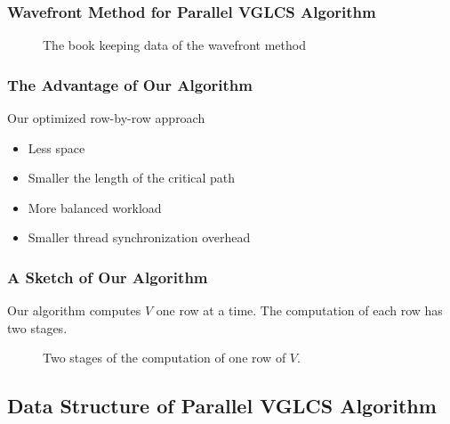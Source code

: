 \begin{withoutheadline}
\begin{frame}
	\frametitle{Wavefront Method for Parallel VGLCS Algorithm}
	\begin{figure}[!thb]
	  \centering {} 
	  \caption{The book keeping data of the wavefront method}
	  \label{fig:fig-VGLCS-dp-wavefront}
	\end{figure}
\end{frame}
\end{withoutheadline}

\begin{frame}
	\frametitle{The Advantage of Our Algorithm}
	Our optimized row-by-row approach
	\begin{itemize}
		\setlength\itemsep{1em}
		\item 
			Less space
		\item 
			Smaller the length of the critical path
		\item 
			More balanced workload
		\item 
			Smaller thread synchronization overhead
	\end{itemize}
\end{frame}

\begin{frame}
	\frametitle{A Sketch of Our Algorithm}
	Our algorithm computes $V$ one row at a time.  The computation of
	each row has two stages.
	\begin{center}
		\scalebox{.7} { \begin{minipage}{1.2\textwidth}
			\begin{figure}
			  \centering {} 
			  \caption{Two stages of the computation of one row of $V$.}
			  \label{fig:fig-VGLCS-dp-rmq}
			\end{figure}
			\end{minipage}
		}
	\end{center}
\end{frame}

\subsection{Data Structure of Parallel VGLCS Algorithm}
